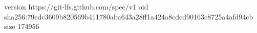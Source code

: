 version https://git-lfs.github.com/spec/v1
oid sha256:79edc3609b820569b411780aba643a28ff1a424a8cdcd90163c8725a4afd94cb
size 174956
